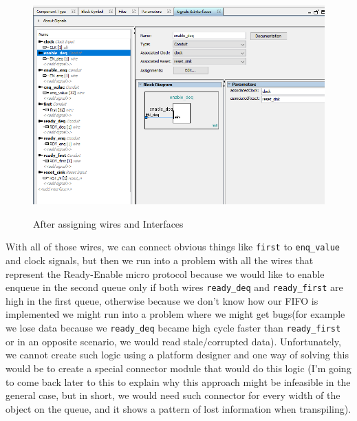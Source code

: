\documentclass[12pt]{report}
\begin{document}
\begin{figure}[H] 
    \caption{After assigning wires and Interfaces} 
    \includegraphics[width=\textwidth]{images/Example1AfterOrganization.png} \\ \centering 
\end{figure} 
With all of those wires, we can connect obvious things like \verb!first! to \verb!enq_value! and clock signals, but then we run into a problem with all the wires that represent the Ready-Enable micro protocol because we would like to enable enqueue in the second queue only if both wires \verb!ready_deq! and \verb!ready_first! are high in the first queue, otherwise because we don't know how our FIFO is implemented we might run into a problem where we might get bugs(for example we lose data because we \verb!ready_deq! became high cycle faster than \verb!ready_first! or in an opposite scenario, we would read stale/corrupted data).
Unfortunately, we cannot create such logic using a platform designer and one way of solving this would be to create a special connector module that would do this logic (I'm going to come back later to this to explain why this approach might be infeasible in the general case, but in short, we would need such connector for every width of the object on the queue, and it shows a pattern of lost information when transpiling). 
\end{document}
